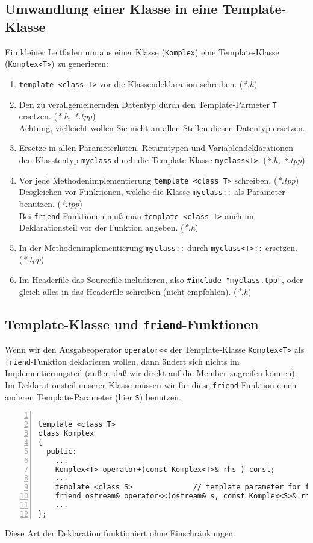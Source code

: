 \subsection{Umwandlung einer Klasse in eine Template-Klasse}
\label{p:10.2.3}
%
Ein kleiner Leitfaden um aus einer Klasse (\verb|Komplex|) eine Template-Klasse (\verb|Komplex<T>|)
zu generieren:
\begin{enumerate}
    \item \verb|template <class T>| vor die Klassendeklaration schreiben. \hfill  (\emph{*.h})
    \item Den zu verallgemeinernden Datentyp durch den Template-Parmeter \verb|T| ersetzen.
      \hfill  (\emph{*.h, *.tpp}) \\
        Achtung, vielleicht wollen Sie nicht an allen Stellen diesen Datentyp ersetzen.
    \item Ersetze in allen Parameterlisten, Returntypen und Variablendeklarationen den Klasstentyp \verb|myclass|
      durch die Template-Klasse \verb|myclass<T>|. \hfill  (\emph{*.h, *.tpp})
    \item Vor jede Methodenimplementierung \verb|template <class T>| schreiben. \hfill(\emph{*.tpp}) \\
      Desgleichen vor Funktionen, welche die Klasse \verb|myclass::| als Parameter benutzen. \hfill(\emph{*.tpp}) \\
      Bei \verb|friend|-Funktionen muß man \verb|template <class T>| auch im Deklarationsteil vor der Funktion angeben.
      \hfill  (\emph{*.h})
    \item In der Methodenimplementierung \verb|myclass::| durch \verb|myclass<T>::| ersetzen. \hfill(\emph{*.tpp})
    \item  Im Headerfile das Sourcefile includieren, also \verb|#include "myclass.tpp"|, oder
      gleich alles in das Headerfile schreiben (nicht empfohlen). \hfill  (\emph{*.h})
\end{enumerate}

\subsection{Template-Klasse und \texttt{friend}-Funktionen}
\label{p:10.2.4}
%
Wenn wir den Ausgabeoperator \verb|operator<<| der Template-Klasse \verb|Komplex<T>| als \texttt{friend}-Funktion deklarieren wollen,
dann ändert sich nichts im Implementierungsteil (außer, daß wir direkt auf die Member zugreifen können).
Im Deklarationsteil unserer Klasse müssen wir für diese \verb|friend|-Funktion einen anderen Template-Parameter 
(hier \verb|S|) benutzen.
\begin{lstlisting}[basicstyle=\scriptsize,numbers=left, numberstyle=\tiny, stepnumber=2, numbersep=5pt]

template <class T>
class Komplex
{
  public:
    ...
    Komplex<T> operator+(const Komplex<T>& rhs ) const;
    ...
    template <class S>              // template parameter for following deklaration
    friend ostream& operator<<(ostream& s, const Komplex<S>& rhs);
    ...
};
\end{lstlisting}
%
Diese Art der Deklaration funktioniert ohne Einschränkungen.

